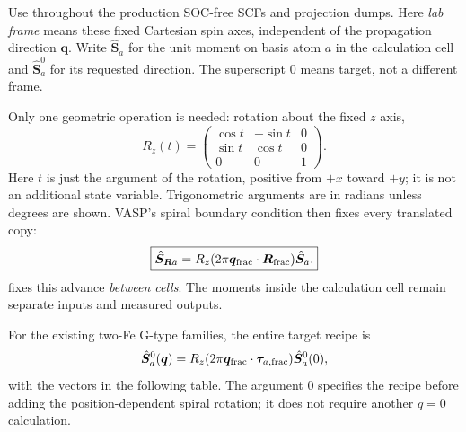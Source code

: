 \documentclass[11pt,a4paper]{article}
\numberwithin{equation}{section}
\newcommand{\vct}[1]{\bm{#1}}
\newcommand{\qh}{\vct q}
\newcommand{\code}[1]{\texttt{\detokenize{#1}}}
\begin{document}
Use \code{SAXIS = 0 0 1} throughout the production SOC-free SCFs and
projection dumps. Here \emph{lab frame} means these fixed Cartesian spin
axes, independent of the propagation direction $\qh$.
Write $\hat{\vct S}_a$ for the unit moment on basis atom $a$ in the
calculation cell and $\hat{\vct S}_a^0$ for its requested direction.
The superscript $0$ means target, not a different frame.

Only one geometric operation is needed: rotation about the fixed $z$ axis,
\begin{equation}\label{eq:Rz}
 R_z(t)=
 \begin{pmatrix}
 \cos t&-\sin t&0\\
 \sin t& \cos t&0\\
 0&0&1
 \end{pmatrix}.
\end{equation}
Here $t$ is just the argument of the rotation, positive from $+x$ toward
$+y$; it is not an additional state variable. Trigonometric arguments
are in radians unless degrees are shown.
VASP's spiral boundary condition then fixes every translated copy:
\begin{equation}\label{eq:spin}
 \boxed{\hat{\vct S}_{\vct R a}
 =R_z(2\pi\qh_{\rm frac}\cdot\vct R_{\rm frac})\hat{\vct S}_a.}
\end{equation}
\code{QSPIRAL} fixes this advance \emph{between cells}. The moments
inside the calculation cell remain separate inputs and measured outputs.

For the existing two-Fe G-type families, the entire target recipe is
\begin{equation}\label{eq:target}
 \hat{\vct S}_a^0(\qh)=
 R_z(2\pi\qh_{\rm frac}\cdot\vct\tau_{a,\rm frac})
 \hat{\vct S}_a^0(0),
\end{equation}
with the vectors in the following table. The argument $0$ specifies the
recipe before adding the position-dependent spiral rotation; it does not
require another $q=0$ calculation.
\end{document}
